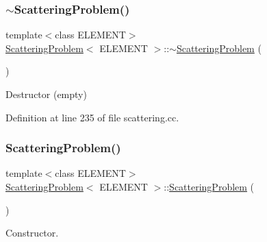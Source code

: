 \subsubsection{\texorpdfstring{$\sim$\+Scattering\+Problem()}{~ScatteringProblem()}\hspace{0.1cm}{\footnotesize\ttfamily [1/2]}}
{\footnotesize\ttfamily template$<$class E\+L\+E\+M\+E\+NT$>$ \\
\hyperlink{classScatteringProblem}{Scattering\+Problem}$<$ E\+L\+E\+M\+E\+NT $>$\+::$\sim$\hyperlink{classScatteringProblem}{Scattering\+Problem} (\begin{DoxyParamCaption}{ }\end{DoxyParamCaption})\hspace{0.3cm}{\ttfamily [inline]}}



Destructor (empty) 



Definition at line 235 of file scattering.\+cc.

\mbox{\label{classScatteringProblem_a94710f5d2ee52abc3df9dc8d1fd3eb71}} 
\subsubsection{\texorpdfstring{Scattering\+Problem()}{ScatteringProblem()}\hspace{0.1cm}{\footnotesize\ttfamily [2/2]}}
{\footnotesize\ttfamily template$<$class E\+L\+E\+M\+E\+NT$>$ \\
\hyperlink{classScatteringProblem}{Scattering\+Problem}$<$ E\+L\+E\+M\+E\+NT $>$\+::\hyperlink{classScatteringProblem}{Scattering\+Problem} (\begin{DoxyParamCaption}{ }\end{DoxyParamCaption})}



Constructor. 

\mbox{\label{classScatteringProblem_a0a9838027d0286f22706fe6945bbac0a}} 
